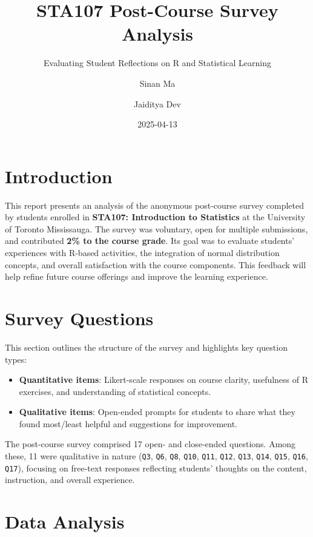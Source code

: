 \documentclass[
  letterpaper,
  DIV=11,
  numbers=noendperiod]{scrartcl}
\title{STA107 Post-Course Survey Analysis}
\subtitle{Evaluating Student Reflections on R and Statistical Learning}
\author{Sinan Ma \and Jaiditya Dev}
\date{2025-04-13}
\providecommand{\tightlist}{%
  \setlength{\itemsep}{0pt}\setlength{\parskip}{0pt}}\usepackage{longtable,booktabs,array}
\renewcommand*\contentsname{Table of contents}
\newcommand\contentsname{Table of contents}
\begin{document}
\maketitle

\renewcommand*\contentsname{Table of contents}
{
\hypersetup{linkcolor=}
\setcounter{tocdepth}{3}
\tableofcontents
}

\section{Introduction}\label{introduction}

This report presents an analysis of the anonymous post-course survey
completed by students enrolled in \textbf{STA107: Introduction to
Statistics} at the University of Toronto Mississauga. The survey was
voluntary, open for multiple submissions, and contributed \textbf{2\% to
the course grade}. Its goal was to evaluate students' experiences with
R-based activities, the integration of normal distribution concepts, and
overall satisfaction with the course components. This feedback will help
refine future course offerings and improve the learning experience.

\section{Survey Questions}\label{survey-questions}

This section outlines the structure of the survey and highlights key
question types:

\begin{itemize}
\tightlist
\item
  \textbf{Quantitative items}: Likert-scale responses on course clarity,
  usefulness of R exercises, and understanding of statistical concepts.
\item
  \textbf{Qualitative items}: Open-ended prompts for students to share
  what they found most/least helpful and suggestions for improvement.
\end{itemize}

The post-course survey comprised 17 open- and close-ended questions.
Among these, 11 were qualitative in nature (\texttt{Q3}, \texttt{Q6},
\texttt{Q8}, \texttt{Q10}, \texttt{Q11}, \texttt{Q12}, \texttt{Q13},
\texttt{Q14}, \texttt{Q15}, \texttt{Q16}, \texttt{Q17}), focusing on
free-text responses reflecting students' thoughts on the content,
instruction, and overall experience.

\section{Data Analysis}\label{data-analysis}
\end{document}
